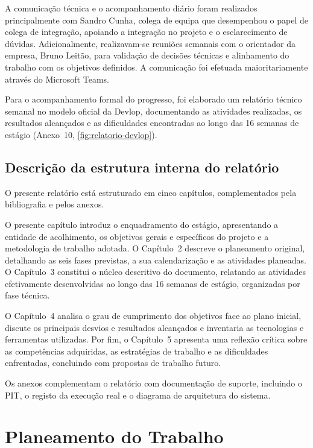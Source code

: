 \documentclass[a4paper,12pt]{report}
\begin{document}
A comunicação técnica e o acompanhamento diário foram realizados principalmente com Sandro Cunha, colega de equipa que desempenhou o papel de colega de integração, apoiando a integração no projeto e o esclarecimento de dúvidas. Adicionalmente, realizavam-se reuniões semanais com o orientador da empresa, Bruno Leitão, para validação de decisões técnicas e alinhamento do trabalho com os objetivos definidos. A comunicação foi efetuada maioritariamente através do Microsoft Teams.

Para o acompanhamento formal do progresso, foi elaborado um relatório técnico semanal no modelo oficial da Devlop, documentando as atividades realizadas, os resultados alcançados e as dificuldades encontradas ao longo das 16 semanas de estágio (Anexo~10, \autoref{fig:relatorio-devlop}).

\section{Descrição da estrutura interna do relatório}

O presente relatório está estruturado em cinco capítulos, complementados pela bibliografia e pelos anexos.

O presente capítulo introduz o enquadramento do estágio, apresentando a entidade de acolhimento, os objetivos gerais e específicos do projeto e a metodologia de trabalho adotada. O Capítulo~2 descreve o planeamento original, detalhando as seis fases previstas, a sua calendarização e as atividades planeadas. O Capítulo~3 constitui o núcleo descritivo do documento, relatando as atividades efetivamente desenvolvidas ao longo das 16 semanas de estágio, organizadas por fase técnica.

O Capítulo~4 analisa o grau de cumprimento dos objetivos face ao plano inicial, discute os principais desvios e resultados alcançados e inventaria as tecnologias e ferramentas utilizadas. Por fim, o Capítulo~5 apresenta uma reflexão crítica sobre as competências adquiridas, as estratégias de trabalho e as dificuldades enfrentadas, concluindo com propostas de trabalho futuro.

Os anexos complementam o relatório com documentação de suporte, incluindo o PIT, o registo da execução real e o diagrama de arquitetura do sistema.

\chapter{Planeamento do Trabalho}
\end{document}
